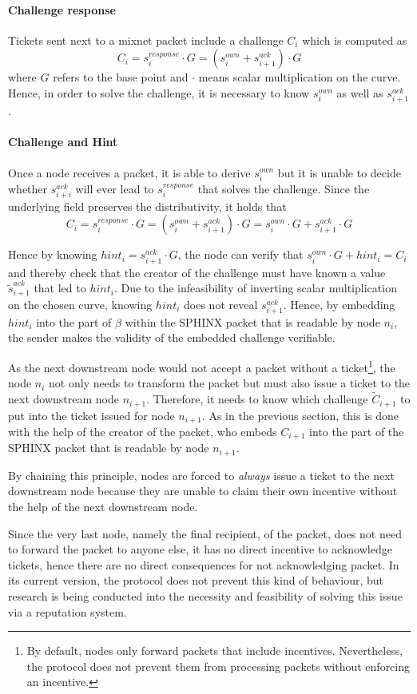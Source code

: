 \paragraph{Challenge response}

Tickets sent next to a mixnet packet include a challenge $C_i$ which is computed as $$C_i = s_i^{response} \cdot G = (s_i^{own} + s_{i+1}^{ack}) \cdot G$$ where $G$ refers to the base point and $\cdot$ means scalar multiplication on the curve. Hence, in order to solve the challenge, it is necessary to know $s_i^{own}$ as well as $s_{i+1}^{ack}$.

\paragraph{Challenge and Hint}
\label{sec:incentives:proofofrelay:challenge}

Once a node receives a packet, it is able to derive $s_i^{own}$ but it is unable to decide whether $s_{i+i}^{ack}$ will ever lead to $s_i^{response}$ that solves the challenge. Since the underlying field preserves the distributivity, it holds that $$C_i = s_i^{response} \cdot G = (s_i^{own} + s_{i+1}^{ack}) \cdot G = s_i^{own} \cdot G + s_{i+1}^{ack} \cdot G$$

Hence by knowing $hint_i = s_{i+1}^{ack} \cdot G$, the node can verify that $s_i^{own} \cdot G + hint_i = C_i$ and thereby check that the creator of the challenge must have known a value $\tilde{s}_{i+1}^{ack}$ that led to $hint_i$. Due to the infeasibility of inverting scalar multiplication on the chosen curve, knowing $hint_i$ does not reveal $s_{i+1}^{ack}$. Hence, by embedding $hint_i$ into the part of $\beta$ within the SPHINX packet that is readable by node $n_i$, the sender makes the validity of the embedded challenge verifiable.

As the next downstream node would not accept a packet without a ticket\footnote{By default, nodes only forward packets that include incentives. Nevertheless, the protocol does not prevent them from processing packets without enforcing an incentive.}, the node $n_i$ not only needs to transform the packet but must also issue a ticket to the next downstream node $n_{i+1}$. Therefore, it needs to know which challenge $\tilde{C}_{i+1}$ to put into the ticket issued for node $n_{i+1}$. As in the previous section, this is done with the help of the creator of the packet, who embeds $C_{i+1}$ into the part of the SPHINX packet that is readable by node $n_{i+1}$.

By chaining this principle, nodes are forced to \textit{always} issue a ticket to the next downstream node because they are unable to claim their own incentive without the help of the next downstream node.

Since the very last node, namely the final recipient, of the packet, does not need to forward the packet to anyone else, it has no direct incentive to acknowledge tickets, hence there are no direct consequences for not acknowledging packet. In its current version, the protocol does not prevent this kind of behaviour, but research is being conducted into the necessity and feasibility of solving this issue via a reputation system.